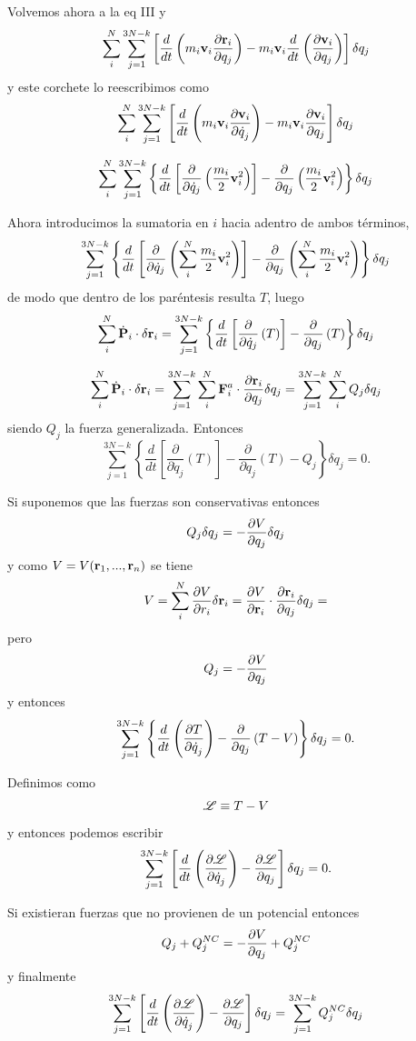 \documentclass[10pt,oneside]{CBFT_article}
\begin{document}
Volvemos ahora a la eq III y 
\[
\sum_i^N \sum_{j=1}^{3N-k} \left[ 
\frac{d}{dt} \left( m_i \vb{v}_i \dpar{\vb{r}_i}{q_j} \right) -  m_i \vb{v}_i \frac{d}{dt}\left( \dpar{\vb{v}_i}{q_j} \right)
\right] \delta q_j
\]
y este corchete lo reescribimos como 
\[
\sum_i^N \sum_{j=1}^{3N-k} \left[ 
\frac{d}{dt} \left( m_i \vb{v}_i \dpar{\vb{v}_i}{\dot{q}_j} \right) -  m_i \vb{v}_i \dpar{\vb{v}_i}{q_j} 
\right] \delta q_j
\]

\[
\sum_i^N \sum_{j=1}^{3N-k} \left\{ 
\frac{d}{dt} \left[ \frac{\partial}{\partial \dot{q}_j} \left( \frac{m_i}{2} \vb{v}_i^2 \right) \right] - 
 \frac{\partial}{\partial q_j} \left( \frac{m_i}{2} \vb{v}_i^2 \right)
\right\} \delta q_j
\]

Ahora introducimos la sumatoria en $i$ hacia adentro de ambos términos,
\[
\sum_{j=1}^{3N-k} \left\{ 
\frac{d}{dt} \left[ \frac{\partial}{\partial \dot{q}_j} \left( \sum_i^N \frac{m_i}{2} \vb{v}_i^2 \right) \right] - 
 \frac{\partial}{\partial q_j} \left( \sum_i^N \frac{m_i}{2} \vb{v}_i^2 \right)
\right\} \delta q_j
\]
de modo que dentro de los paréntesis resulta $T$, luego 
\[
\sum_i^N \dot{\vb{P}}_i \cdot \delta \vb{r}_i = 
\sum_{j=1}^{3N-k} \left\{ 
\frac{d}{dt} \left[ \frac{\partial}{\partial \dot{q}_j} \left( T \right) \right] - 
 \frac{\partial}{\partial q_j} \left( T \right) \right\} \delta q_j
\]

\[
\sum_i^N \dot{\vb{P}}_i \cdot \delta \vb{r}_i = 
\sum_{j=1}^{3N-k} \sum_i^N \vb{F}_i^a \cdot \dpar{\vb{r}_i}{q_j} \delta q_j =  
\sum_{j=1}^{3N-k} \sum_i^N Q_j \delta q_j
\]
siendo $Q_j$ la fuerza generalizada. Entonces
\[
\sum_{j=1}^{3N-k} \left\{ \frac{d}{dt}
\left[ \frac{\partial}{\partial \dot{q}_j} \left( T \right) \right] - \frac{\partial}{\partial q_j} \left( T \right) - Q_j 
\right\} \delta q_j =  0.
\]

Si suponemos que las fuerzas son conservativas entonces 
\[
Q_j \delta q_j = -\frac{\partial^{\hspace{-0.05em}} {V}}{\partial {q_j}^{\hspace{-0.05em}}}\delta q_j
\]
y como $V=V(\vb{r}_1,...,\vb{r}_n)$ se tiene 
\[
V = \sum_i^N  \dpar{V}{r_i} \delta \vb{r}_i = \dpar{V}{\vb{r}_i} \cdot \dpar{\vb{r}_i}{q_j} \delta q_j =
\]
pero 
\[
Q_j = - \frac{\partial^{\hspace{-0.05em}} {V}}{\partial {q_j}^{\hspace{-0.05em}}}
\]
y entonces 
\[
\sum_{j=1}^{3N-k} \left\{ 
\frac{d}{dt} \left( \frac{\partial^{\hspace{-0.05em}} {T}}{\partial {\dot{q}_j}^{\hspace{-0.05em}}} \right) - \frac{\partial}{\partial q_j} \left( T - V \right) \right\} \delta q_j =  0.
\]

Definimos como 
\[
\mathscr{L} \equiv T - V
\]
y entonces podemos escribir
\[
\sum_{j=1}^{3N-k} \left[
\frac{d}{dt} \left( \frac{\partial^{\hspace{-0.05em}} {\mathscr{L}}}{\partial {\dot{q}_j}^{\hspace{-0.05em}}} \right) -  \frac{\partial^{\hspace{-0.05em}} {\mathscr{L}}}{\partial {q_j}^{\hspace{-0.05em}}} \right] \delta q_j =  0.
\]

Si existieran fuerzas que no provienen de un potencial entonces
\[
Q_j + Q_j^{NC} = -\frac{\partial^{\hspace{-0.05em}} {V}}{\partial {q_j}^{\hspace{-0.05em}}} + Q_j^{NC}
\]
y finalmente 
\[
\sum_{j=1}^{3N-k} \left[
\frac{d}{dt} \left( \frac{\partial^{\hspace{-0.05em}} {\mathscr{L}}}{\partial {\dot{q}_j}^{\hspace{-0.05em}}} \right) -  \frac{\partial^{\hspace{-0.05em}} {\mathscr{L}}}{\partial {q_j}^{\hspace{-0.05em}}} \right] \delta q_j = 
\sum_{j=1}^{3N-k} Q_j^{NC} \delta q_j
\]
\end{document}
